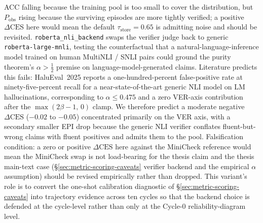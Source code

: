ACC falling because the training pool is too small to cover the
distribution, but $P_{\text{obs}}$ rising because the surviving
episodes are more tightly verified; a positive
$\Delta\text{CES}$ here would mean the default
$\tau_{\text{store}} = 0.65$ is admitting noise and should be
revisited. \texttt{roberta\_nli\_backend} swaps the verifier judge
back to generic \texttt{roberta-large-mnli}, testing the counterfactual
that a natural-language-inference model trained on human MultiNLI /
SNLI pairs could ground the purity theorem's $\alpha > \tfrac{1}{2}$
premise on language-model-generated claims. Literature predicts this
fails: HaluEval~2025 reports a one-hundred-percent false-positive
rate at ninety-five-percent recall for a near-state-of-the-art generic
NLI model on LM hallucinations, corresponding to $\alpha \le 0.475$
and a zero VER-axis contribution after the $\max(2\beta-1,\,0)$
clamp. We therefore predict a moderate negative
$\Delta\text{CES}$ ($-0.02$ to $-0.05$) concentrated primarily on the
VER axis, with a secondary smaller EPI drop because the generic NLI
verifier conflates fluent-but-wrong claims with fluent positives and
admits them to the pool. Falsification condition: a zero or positive
$\Delta\text{CES}$ here against the MiniCheck reference would mean
the MiniCheck swap is not load-bearing for the thesis claim and the
thesis main-text case (\S\ref{sec:metric-scoring-caveats} verifier
backend and the empirical $\alpha$ assumption) should be revised
empirically rather than dropped. This variant's role is to convert
the one-shot calibration diagnostic of
\S\ref{sec:metric-scoring-caveats} into trajectory evidence across
ten cycles so that the backend choice is defended at the cycle-level
rather than only at the Cycle-0 reliability-diagram level.

